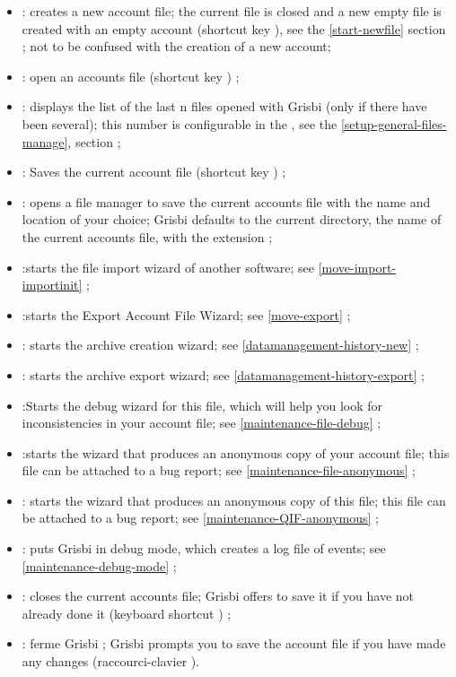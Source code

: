 \begin{itemize}
	\item {} : creates a new account file; the current file is closed and a new empty file is created with an empty account (shortcut key ),  see the \vref{start-newfile} section ; not to be confused with the creation of a new account;
	\item {} : open an accounts file  (shortcut key  ) ;
	\item {} : displays the list of the last n files opened with Grisbi (only if there have been several); this number is configurable in the , see the \vref{setup-general-files-manage},  section ;
	\item {} : Saves the current account file  (shortcut key ) ;
	\item {} : opens a file manager to save the current accounts file with the name and location of your choice; Grisbi defaults to the current directory, the name of the current accounts file, with the  extension ;
	\item {} :starts the file import wizard of another software; see  \vref{move-import-importinit} ;
	\item {} :starts the Export Account File Wizard; see \vref{move-export} ;	
	\item {} : starts the archive creation wizard; see \vref{datamanagement-history-new} ;	
	\item {} : starts the archive export wizard; see \vref{datamanagement-history-export} ;
	\item {} :Starts the debug wizard for this file, which will help you look for inconsistencies in your account file; see  \vref{maintenance-file-debug} ;
	\item {} :starts the wizard that produces an anonymous copy of your account file; this file can be attached to a bug report; see \vref{maintenance-file-anonymous} ;	
	\item {} :  starts the wizard that produces an anonymous copy of this file; this file can be attached to a bug report; see \vref{maintenance-QIF-anonymous} ;	
	\item {} : puts Grisbi in debug mode, which creates a log file of events; see \vref{maintenance-debug-mode} ; 	
	\item {} : closes the current accounts file; Grisbi offers to save it if you have not already done it (keyboard shortcut ) ;
	\item {} : ferme Grisbi ; Grisbi prompts you to save the account file if you have made any changes (raccourci-clavier ).
\end{itemize}


